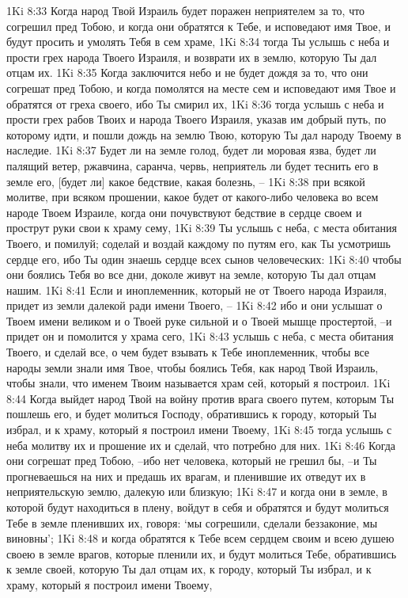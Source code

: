 1Ki 8:33  Когда народ Твой Израиль будет поражен неприятелем за то, что согрешил пред Тобою, и когда они обратятся к Тебе, и исповедают имя Твое, и будут просить и умолять Тебя в сем храме,
1Ki 8:34  тогда Ты услышь с неба и прости грех народа Твоего Израиля, и возврати их в землю, которую Ты дал отцам их.
1Ki 8:35  Когда заключится небо и не будет дождя за то, что они согрешат пред Тобою, и когда помолятся на месте сем и исповедают имя Твое и обратятся от греха своего, ибо Ты смирил их,
1Ki 8:36  тогда услышь с неба и прости грех рабов Твоих и народа Твоего Израиля, указав им добрый путь, по которому идти, и пошли дождь на землю Твою, которую Ты дал народу Твоему в наследие.
1Ki 8:37  Будет ли на земле голод, будет ли моровая язва, будет ли палящий ветер, ржавчина, саранча, червь, неприятель ли будет теснить его в земле его, [будет ли] какое бедствие, какая болезнь, --
1Ki 8:38  при всякой молитве, при всяком прошении, какое будет от какого-либо человека во всем народе Твоем Израиле, когда они почувствуют бедствие в сердце своем и прострут руки свои к храму сему,
1Ki 8:39  Ты услышь с неба, с места обитания Твоего, и помилуй; соделай и воздай каждому по путям его, как Ты усмотришь сердце его, ибо Ты один знаешь сердце всех сынов человеческих:
1Ki 8:40  чтобы они боялись Тебя во все дни, доколе живут на земле, которую Ты дал отцам нашим.
1Ki 8:41  Если и иноплеменник, который не от Твоего народа Израиля, придет из земли далекой ради имени Твоего, --
1Ki 8:42  ибо и они услышат о Твоем имени великом и о Твоей руке сильной и о Твоей мышце простертой, --и придет он и помолится у храма сего,
1Ki 8:43  услышь с неба, с места обитания Твоего, и сделай все, о чем будет взывать к Тебе иноплеменник, чтобы все народы земли знали имя Твое, чтобы боялись Тебя, как народ Твой Израиль, чтобы знали, что именем Твоим называется храм сей, который я построил.
1Ki 8:44  Когда выйдет народ Твой на войну против врага своего путем, которым Ты пошлешь его, и будет молиться Господу, обратившись к городу, который Ты избрал, и к храму, который я построил имени Твоему,
1Ki 8:45  тогда услышь с неба молитву их и прошение их и сделай, что потребно для них.
1Ki 8:46  Когда они согрешат пред Тобою, --ибо нет человека, который не грешил бы, --и Ты прогневаешься на них и предашь их врагам, и пленившие их отведут их в неприятельскую землю, далекую или близкую;
1Ki 8:47  и когда они в земле, в которой будут находиться в плену, войдут в себя и обратятся и будут молиться Тебе в земле пленивших их, говоря: `мы согрешили, сделали беззаконие, мы виновны';
1Ki 8:48  и когда обратятся к Тебе всем сердцем своим и всею душею своею в земле врагов, которые пленили их, и будут молиться Тебе, обратившись к земле своей, которую Ты дал отцам их, к городу, который Ты избрал, и к храму, который я построил имени Твоему,
